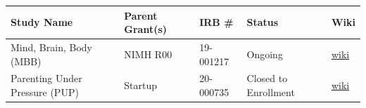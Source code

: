 \documentclass[]{book}
\begin{document}
\begin{longtable}[]{@{}lllll@{}}
\toprule
\begin{minipage}[b]{0.32\columnwidth}\raggedright
Study Name\strut
\end{minipage} & \begin{minipage}[b]{0.21\columnwidth}\raggedright
Parent Grant(s)\strut
\end{minipage} & \begin{minipage}[b]{0.13\columnwidth}\raggedright
IRB \#\strut
\end{minipage} & \begin{minipage}[b]{0.10\columnwidth}\raggedright
Status\strut
\end{minipage} & \begin{minipage}[b]{0.10\columnwidth}\raggedright
Wiki\strut
\end{minipage}\tabularnewline
\midrule
\endhead
\begin{minipage}[t]{0.32\columnwidth}\raggedright
Mind, Brain, Body (MBB)\strut
\end{minipage} & \begin{minipage}[t]{0.21\columnwidth}\raggedright
NIMH R00\strut
\end{minipage} & \begin{minipage}[t]{0.13\columnwidth}\raggedright
19-001217\strut
\end{minipage} & \begin{minipage}[t]{0.10\columnwidth}\raggedright
Ongoing\strut
\end{minipage} & \begin{minipage}[t]{0.10\columnwidth}\raggedright
\href{https://bablab.github.io/wiki_mind_brain_body/}{wiki}\strut
\end{minipage}\tabularnewline
\begin{minipage}[t]{0.32\columnwidth}\raggedright
Parenting Under Pressure (PUP)\strut
\end{minipage} & \begin{minipage}[t]{0.21\columnwidth}\raggedright
Startup\strut
\end{minipage} & \begin{minipage}[t]{0.13\columnwidth}\raggedright
20-000735\strut
\end{minipage} & \begin{minipage}[t]{0.10\columnwidth}\raggedright
Closed to Enrollment\strut
\end{minipage} & \begin{minipage}[t]{0.10\columnwidth}\raggedright
\href{https://bablab.github.io/wiki_parenting_under_pressure/}{wiki}\strut

\end{minipage}
\end{longtable}
\end{document}
